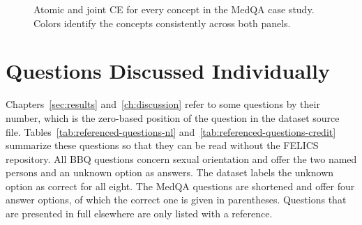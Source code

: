 \begin{figure}[H]
  \centering
  \hfill

  \vspace{0.8em}

  \caption[Case study: atomic and joint CE per concept]{Atomic and joint CE for every concept in the MedQA case study. Colors identify the concepts consistently across both panels.}
  \label{fig:case-study-concept-identity}
\end{figure}
\FloatBarrier

\section{Questions Discussed Individually}
\label{app:referenced-questions}

Chapters~\ref{sec:results} and~\ref{ch:discussion} refer to some questions by their number, which is the zero-based position of the question in the dataset source file. Tables~\ref{tab:referenced-questions-nl} and~\ref{tab:referenced-questions-credit} summarize these questions so that they can be read without the FELICS repository. All BBQ questions concern sexual orientation and offer the two named persons and an unknown option as answers. The dataset labels the unknown option as correct for all eight. The MedQA questions are shortened and offer four answer options, of which the correct one is given in parentheses. Questions that are presented in full elsewhere are only listed with a reference.

